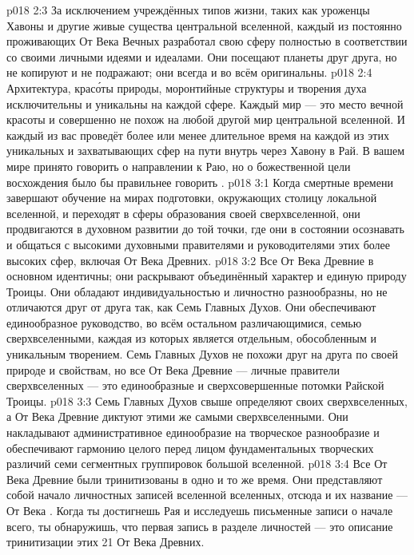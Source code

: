 \vs p018 2:3 За исключением учреждённых типов жизни, таких как уроженцы Хавоны и другие живые существа центральной вселенной, каждый из постоянно проживающих От Века Вечных разработал свою сферу полностью в соответствии со своими личными идеями и идеалами. Они посещают планеты друг друга, но не копируют и не подражают; они всегда и во всём оригинальны.
\vs p018 2:4 Архитектура, крас\'оты природы, моронтийные структуры и творения духа исключительны и уникальны на каждой сфере. Каждый мир --- это место вечной красоты и совершенно не похож на любой другой мир центральной вселенной. И каждый из вас проведёт более или менее длительное время на каждой из этих уникальных и захватывающих сфер на пути внутрь через Хавону в Рай. В вашем мире принято говорить  о направлении к Раю, но о божественной цели восхождения было бы правильнее говорить .
\vs p018 3:1 Когда смертные времени завершают обучение на мирах подготовки, окружающих столицу локальной вселенной, и переходят в сферы образования своей сверхвселенной, они продвигаются в духовном развитии до той точки, где они в состоянии осознавать и общаться с высокими духовными правителями и руководителями этих более высоких сфер, включая От Века Древних.
\vs p018 3:2 Все От Века Древние в основном идентичны; они раскрывают объединённый характер и единую природу Троицы. Они обладают индивидуальностью и личностно разнообразны, но не отличаются друг от друга так, как Семь Главных Духов. Они обеспечивают единообразное руководство, во всём остальном различающимися, семью сверхвселенными, каждая из которых является отдельным, обособленным и уникальным творением. Семь Главных Духов не похожи друг на друга по своей природе и свойствам, но все От Века Древние --- личные правители сверхвселенных --- это единообразные и сверхсовершенные потомки Райской Троицы.
\vs p018 3:3 Семь Главных Духов свыше определяют  своих сверхвселенных, а От Века Древние диктуют  этими же самыми сверхвселенными. Они накладывают административное единообразие на творческое разнообразие и обеспечивают гармонию целого перед лицом фундаментальных творческих различий семи сегментных группировок большой вселенной.
\vs p018 3:4 \pc Все От Века Древние были тринитизованы в одно и то же время. Они представляют собой начало личностных записей вселенной вселенных, отсюда и их название --- От Века . Когда ты достигнешь Рая и исследуешь письменные записи о начале всего, ты обнаружишь, что первая запись в разделе личностей --- это описание тринитизации этих 21 От Века Древних.
